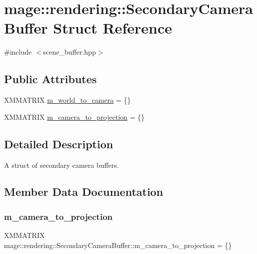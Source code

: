 \hypertarget{structmage_1_1rendering_1_1_secondary_camera_buffer}{}\section{mage\+:\+:rendering\+:\+:Secondary\+Camera\+Buffer Struct Reference}
\label{structmage_1_1rendering_1_1_secondary_camera_buffer}


{\ttfamily \#include $<$scene\+\_\+buffer.\+hpp$>$}

\subsection*{Public Attributes}
\begin{DoxyCompactItemize}
\item 
X\+M\+M\+A\+T\+R\+IX \mbox{\hyperlink{structmage_1_1rendering_1_1_secondary_camera_buffer_a3f131146f9374058ace582bfae3e90b7}{m\+\_\+world\+\_\+to\+\_\+camera}} = \{\}
\item 
X\+M\+M\+A\+T\+R\+IX \mbox{\hyperlink{structmage_1_1rendering_1_1_secondary_camera_buffer_a05e3f20005a72a77017ecb76f683efdd}{m\+\_\+camera\+\_\+to\+\_\+projection}} = \{\}
\end{DoxyCompactItemize}


\subsection{Detailed Description}
A struct of secondary camera buffers. 

\subsection{Member Data Documentation}
\mbox{\label{structmage_1_1rendering_1_1_secondary_camera_buffer_a05e3f20005a72a77017ecb76f683efdd}} 
\subsubsection{\texorpdfstring{m\+\_\+camera\+\_\+to\+\_\+projection}{m\_camera\_to\_projection}}
{\footnotesize\ttfamily X\+M\+M\+A\+T\+R\+IX mage\+::rendering\+::\+Secondary\+Camera\+Buffer\+::m\+\_\+camera\+\_\+to\+\_\+projection = \{\}}

